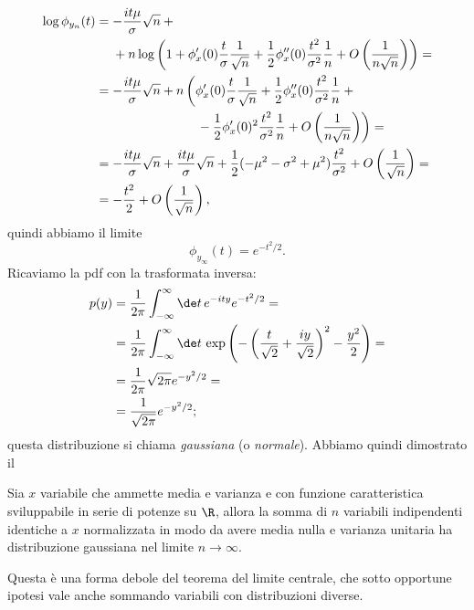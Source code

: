 \begin{align*}
	\log\phi_{y_n}(t)
	&= -\frac{it\mu}{\sigma}\sqrt n + {} \\
	&\phantom{{}={}} + n \log\left(1 + \phi_x'(0) \frac t\sigma \frac1{\sqrt n}
	+ \frac12 \phi_x''(0) \frac{t^2}{\sigma^2} \frac1n
	+ O\left(\frac1{n\sqrt n}\right) \right) = \\
	&= -\frac{it\mu}{\sigma}\sqrt n
	+ n \left( \phi_x'(0) \frac t\sigma \frac1{\sqrt n}
	+ \frac12 \phi_x''(0) \frac{t^2}{\sigma^2} \frac 1n + {}\right. \\
	&\left.\phantom{= -\frac{it\mu}{\sigma}\sqrt n + n\left(\vphantom{\frac1{\sqrt n}}\right.}
	- \frac12 \phi_x'(0)^2 \frac{t^2}{\sigma^2} \frac 1n 
	+ O\left(\frac1{n\sqrt n}\right) \right) = \\
	&= -\frac{it\mu}{\sigma}\sqrt n
	+ \frac{it\mu}{\sigma}\sqrt n
	+ \frac12 (-\mu^2 - \sigma^2 + \mu^2) \frac{t^2}{\sigma^2} + O\left(\frac1{\sqrt n}\right) = \\
	&= -\frac{t^2}2 + O\left(\frac1{\sqrt n}\right),
\end{align*}
quindi abbiamo il limite
\begin{equation*}
	\phi_{y_\infty}(t) = e^{-t^2/2}.
\end{equation*}
Ricaviamo la pdf con la trasformata inversa:
\begin{align*}
	p(y)
	&= \frac1{2\pi} \int_{-\infty}^\infty \de t\, e^{-ity} e^{-t^2/2} = \\
	&= \frac1{2\pi} \int_{-\infty}^\infty \de t\,
	\exp\left( -\left(\frac t{\sqrt 2} + \frac{iy}{\sqrt 2}\right)^2 - \frac{y^2}2 \right) = \\
	&= \frac1{2\pi} \sqrt{2\pi} e^{-y^2/2} = \\
	&= \frac1{\sqrt{2\pi}} e^{-y^2/2};
\end{align*}
questa distribuzione si chiama \emph{gaussiana} (o \emph{normale}).
Abbiamo quindi dimostrato il
\begin{theorem}
	\label{th:limitecentrale}
	Sia $x$ variabile che ammette media e varianza e con funzione caratteristica sviluppabile in serie di potenze su $\R$,
	allora la somma di $n$ variabili indipendenti identiche a $x$ normalizzata in modo da avere media nulla e varianza unitaria ha distribuzione gaussiana nel limite $n\to\infty$.
\end{theorem}
Questa è una forma debole del teorema del limite centrale, che sotto opportune ipotesi vale anche sommando variabili con distribuzioni diverse.

